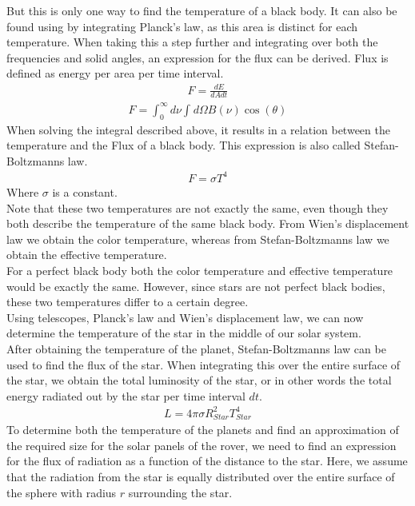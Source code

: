 \documentclass[reprint,english,notitlepage]{revtex4-2}
\begin{document}
But this is only one way to find the temperature of a black body.
It can also be found using by integrating Planck's law, as this area is distinct for each temperature.
When taking this a step further and integrating over both the frequencies and solid angles, an expression for the flux can be derived.
Flux is defined as energy per area per time interval.
\begin{align*}
    F = \frac{dE}{dA dt}
\end{align*}
\begin{align*}
    F = \int_{0}^{\infty} d\nu \int_{}^{} d\Omega B(\nu) \cos\left(\theta\right)
\end{align*}
When solving the integral described above, it results in a relation between the temperature and the Flux of a black body.
This expression is also called Stefan-Boltzmanns law.
\begin{align}
    F = \sigma T^4 \label{stefan_boltzmann_law}
\end{align}
Where $\sigma$ is a constant.\\
Note that these two temperatures are not exactly the same, even though they both describe the temperature of the same black body.
From Wien's displacement law we obtain the color temperature, whereas from Stefan-Boltzmanns law we obtain the effective temperature.\\
For a perfect black body both the color temperature and effective temperature would be exactly the same.
However, since stars are not perfect black bodies, these two temperatures differ to a certain degree.\\
Using telescopes, Planck's law and Wien's displacement law, we can now determine the temperature of the star in the middle of our solar system.\\
After obtaining the temperature of the planet, Stefan-Boltzmanns law can be used to find the flux of the star.
When integrating this over the entire surface of the star, we obtain the total luminosity of the star, or in other words the total energy radiated out by the star per time interval $dt$.
\begin{align}
    L = 4 \pi \sigma R_{Star}^2 T_{Star}^4 \label{Luminosity}
\end{align}
To determine both the temperature of the planets and find an approximation of the required size for the solar panels of the rover, we need to find an expression for the flux of radiation as a function of the distance to the star.
Here, we assume that the radiation from the star is equally distributed over the entire surface of the sphere with radius $r$ surrounding the star.\\
\end{document}
